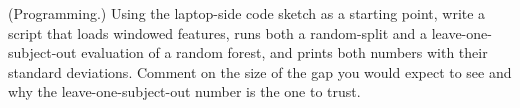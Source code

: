 \begin{exercise}
(Programming.) Using the laptop-side code sketch as a starting point, write a script that
loads windowed features, runs both a random-split and a leave-one-subject-out evaluation
of a random forest, and prints both numbers with their standard deviations. Comment on
the size of the gap you would expect to see and why the leave-one-subject-out number is
the one to trust.
\end{exercise}
